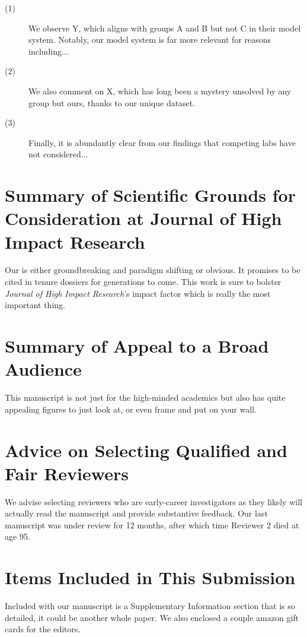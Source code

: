 \documentclass[11pt]{article}
\newcommand{\journalname}{Journal of High Impact Research} %
\begin{document}
\begin{description}
  \item[(1)] We observe Y, which aligns with groups A and B but not C in their model system. Notably, our model system is far more relevant for reasons including...
  \item[(2)] We also comment on X, which has long been a mystery unsolved by any group but ours, thanks to our unique dataset.
  \item[(3)] Finally, it is abundantly clear from our findings that competing labs have not considered...
\end{description}

\section{Summary of Scientific Grounds for Consideration at \journalname}
\noindent Our is either groundbreaking and paradigm shifting or obvious. It promises to be cited in tenure dossiers for generations to come. This work is sure to bolster \textit{\journalname}'s impact factor which is really the most important thing. 

\section{Summary of Appeal to a Broad Audience}
\noindent This manuscript is not just for the high-minded academics but also has quite appealing figures to just look at, or even frame and put on your wall. 

\section{Advice on Selecting Qualified and Fair Reviewers}
\noindent We advise selecting reviewers who are early-career investigators as they likely will actually read the manuscript and provide substantive feedback. Our last manuscript was under review for 12 months, after which time Reviewer 2 died at age 95.

\section{Items Included in This Submission}
\noindent Included with our manuscript is a Supplementary Information section that is so detailed, it could be another whole paper. We also enclosed a couple amazon gift cards for the editors. 

%


\end{document}
